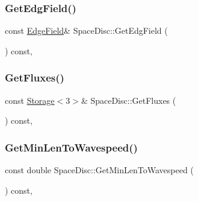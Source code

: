 \subsubsection{\texorpdfstring{Get\+Edg\+Field()}{GetEdgField()}}
{\footnotesize\ttfamily const \hyperlink{ValueField_8h_afe95c3cf57931e46528822035916f101}{Edge\+Field}\& Space\+Disc\+::\+Get\+Edg\+Field (\begin{DoxyParamCaption}{ }\end{DoxyParamCaption}) const\hspace{0.3cm}{\ttfamily [inline]}, {\ttfamily [noexcept]}}

\mbox{\label{structSpaceDisc_a99a97193afb313b64ea56205ac3a35c5}} 
\subsubsection{\texorpdfstring{Get\+Fluxes()}{GetFluxes()}}
{\footnotesize\ttfamily const \hyperlink{Includes_8h_ae7d375db701e28425a3faea2827f134b}{Storage}$<$3$>$\& Space\+Disc\+::\+Get\+Fluxes (\begin{DoxyParamCaption}{ }\end{DoxyParamCaption}) const\hspace{0.3cm}{\ttfamily [inline]}, {\ttfamily [noexcept]}}

\mbox{\label{structSpaceDisc_a156dcd96d37a1a7b8d55511ad7e36cb2}} 
\subsubsection{\texorpdfstring{Get\+Min\+Len\+To\+Wavespeed()}{GetMinLenToWavespeed()}}
{\footnotesize\ttfamily const double Space\+Disc\+::\+Get\+Min\+Len\+To\+Wavespeed (\begin{DoxyParamCaption}{ }\end{DoxyParamCaption}) const\hspace{0.3cm}{\ttfamily [inline]}, {\ttfamily [noexcept]}}

\mbox{\label{structSpaceDisc_ad92de02d3ac084f5545177e5dbad3fe2}} 

